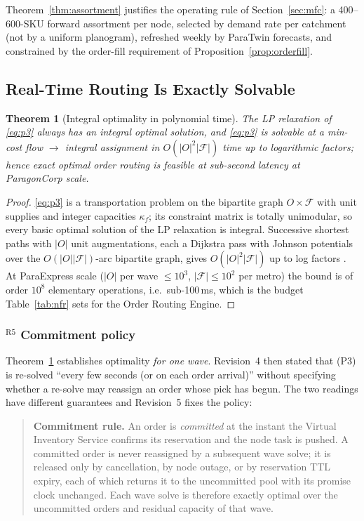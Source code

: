 \documentclass[10pt,twocolumn,letterpaper]{article}
\newtheorem{theorem}{Theorem}
\theoremstyle{definition}
\begin{document}
Theorem~\ref{thm:assortment} justifies the operating rule of Section~\ref{sec:mfc}: a 400--600-SKU forward assortment per node, selected by demand rate per catchment (not by a uniform planogram), refreshed weekly by ParaTwin forecasts, and constrained by the order-fill requirement of Proposition~\ref{prop:orderfill}.

\subsection{Real-Time Routing Is Exactly Solvable}

\begin{theorem}[Integral optimality in polynomial time]\label{thm:routing}
The LP relaxation of \eqref{eq:p3} always has an integral optimal solution, and \eqref{eq:p3} is solvable at a min-cost flow $\to$ integral assignment in $O(|O|^2|\mathcal{F}|)$ time up to logarithmic factors; hence exact optimal order routing is feasible at sub-second latency at ParagonCorp scale.
\end{theorem}
\begin{proof}
\eqref{eq:p3} is a transportation problem on the bipartite graph $O\times\mathcal{F}$ with unit supplies and integer capacities $\kappa_f$; its constraint matrix is totally unimodular, so every basic optimal solution of the LP relaxation is integral. Successive shortest paths with $|O|$ unit augmentations, each a Dijkstra pass with Johnson potentials over the $O(|O||\mathcal{F}|)$-arc bipartite graph, gives $O(|O|^2|\mathcal{F}|)$ up to log factors \cite{ahuja1993}. At ParaExpress scale ($|O|$ per wave $\le10^3$, $|\mathcal{F}|\le10^2$ per metro) the bound is of order $10^8$ elementary operations, i.e.\ sub-100\,ms, which is the budget Table~\ref{tab:nfr} sets for the Order Routing Engine.
\end{proof}

\subsubsection*{$^{\mathrm{R5}}$ Commitment policy}\label{sec:commit}

Theorem~\ref{thm:routing} establishes optimality \emph{for one wave}. Revision~4 then stated that (P3) is re-solved ``every few seconds (or on each order arrival)'' without specifying whether a re-solve may reassign an order whose pick has begun. The two readings have different guarantees and Revision~5 fixes the policy:

\begin{quote}
\textbf{Commitment rule.} An order is \emph{committed} at the instant the Virtual Inventory Service confirms its reservation and the node task is pushed. A committed order is never reassigned by a subsequent wave solve; it is released only by cancellation, by node outage, or by reservation TTL expiry, each of which returns it to the uncommitted pool with its promise clock unchanged. Each wave solve is therefore exactly optimal over the uncommitted orders and residual capacity of that wave.
\end{quote}
\end{document}

